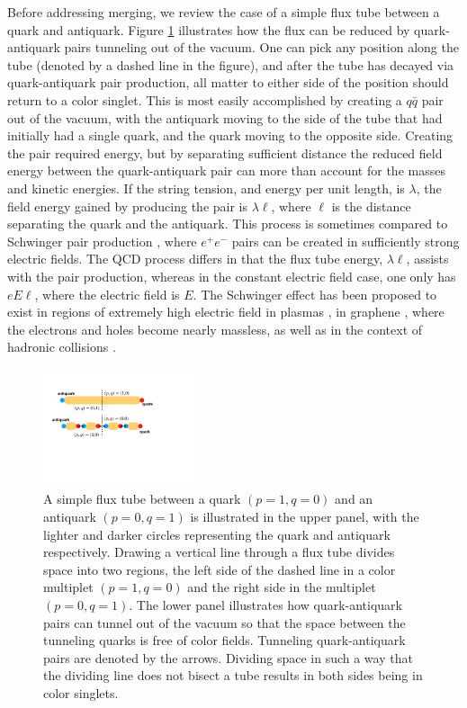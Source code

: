 \documentclass[aps, prc, 12pt, nofootinbib, showpacs, superscriptaddress, tightenlines, groupedaddress]{revtex4-2}
\begin{document}
Before addressing merging, we review the case of a simple flux tube between a quark and antiquark. Figure \ref{fig:simpletube} illustrates how the flux can be reduced by quark-antiquark pairs tunneling out of the vacuum. One can pick any position along the tube (denoted by a dashed line in the figure), and after the tube has decayed via quark-antiquark pair production, all matter to either side of the position should return to a color singlet. This is most easily accomplished by creating a $q\bar{q}$ pair out of the vacuum, with the antiquark moving to the side of the tube that had initially had a single quark, and the quark moving to the opposite side. Creating the pair required energy, but by separating sufficient distance the reduced field energy between the quark-antiquark pair can more than account for the masses and kinetic energies. If the string tension, and energy per unit length, is $\lambda$, the field energy gained by producing the pair is $\lambda \ell$, where $\ell$ is the distance separating the quark and the antiquark. This process is sometimes compared to Schwinger pair production \cite{Schwinger}, where $e^+e^-$ pairs can be created in sufficiently strong electric fields. The QCD process differs in that the flux tube energy, $\lambda\ell$, assists with the pair production, whereas in the constant electric field case, one only has $eE\ell$, where the electric field is $E$. The Schwinger effect has been proposed to exist in regions of extremely high electric field in plasmas \cite{SchwingerPlasma}, in graphene \cite{SchwingerGraphene}, where the electrons and holes become nearly massless, as well as in the context of hadronic collisions \cite{Wong:1994ei,Suganuma:1991ha}.
\begin{figure}
\centerline{\includegraphics[width=0.4\textwidth]{figs/simpletube.pdf}}
\caption{\label{fig:simpletube}
A simple flux tube between a quark $(p=1,q=0)$ and an antiquark $(p=0,q=1)$ is illustrated in the upper panel, with the lighter and darker circles representing the quark and antiquark respectively. Drawing a vertical line through a flux tube divides space into two regions, the left side of the dashed line in a color multiplet $(p=1,q=0)$ and the right side in the multiplet $(p=0,q=1)$. The lower panel illustrates how quark-antiquark pairs can tunnel out of the vacuum so that the space between the tunneling quarks is free of color fields. Tunneling quark-antiquark pairs are denoted by the arrows.  Dividing space in such a way that the dividing line does not bisect a tube results in both sides being in color singlets.
}
\end{figure}
\end{document}
